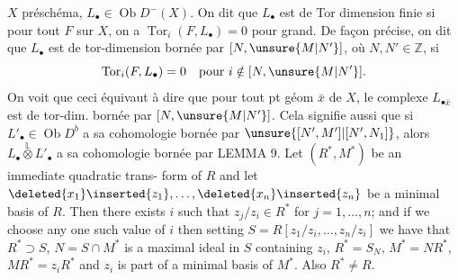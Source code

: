 $X$ préschéma, $L_\bullet\in\operatorname{Ob}D^-(X)$. On dit que 
$L_\bullet$ est de Tor dimension finie si pour tout
 $F$ sur $X$, on a $\operatorname{Tor}_i(F,L_\bullet)=0$
pour  grand.  De façon précise, on dit que
$L_\bullet$ est de  tor-dimension bornée par
$[N,\unsure{M|N'}]$, où  $N,N'\in\mathbb Z$, si
\[
\operatorname{Tor}_i(F,L_\bullet)=0\quad\text{pour }i\notin[N,\unsure{M|N'}].
\]
On voit que ceci équivaut à dire
que pour tout pt géom $\bar x$ de $X$, le complexe
$L_{\bullet\bar x}$ est de tor-dim. bornée par
$[N,\unsure{M|N'}]$.
Cela signifie aussi que si
$L'_\bullet\in\operatorname{Ob}D^b$ a sa cohomologie bornée par $\unsure{[N',M']|[N',N_1]}$,
alors $L_\bullet\overset{\mathbb L}{\otimes}L'_\bullet$ a sa cohomologie bornée par
LEMMA 9. Let $(R^*,M^*)$ be an immediate quadratic trans-
form of $R$ and let $\deleted{x_1}\inserted{z_1},\ldots,\deleted{x_n}\inserted{z_n}$ be a minimal basis of
$R$. Then there exists $i$ such that $z_j/z_i\in R^*$ for
$j=1,\ldots,n$; and if we choose any one such value of
$i$ then setting $S=R[z_1/z_i,\ldots,z_n/z_i]$ we have that
$R^*\supset S$, $N=S\cap M^*$ is a maximal ideal in $S$ containing
$z_i$, $R^*=S_N$, $M^*=NR^*$, $MR^*=z_iR^*$ and $z_i$ is part of
a minimal basis of $M^*$. Also $R^*\ne R$.

